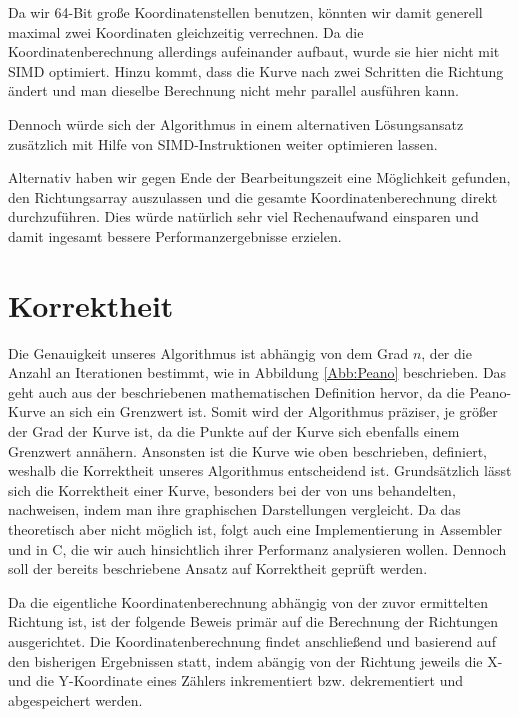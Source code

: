 \documentclass[course=asp]{aspdoc}
\begin{document}
Da wir 64-Bit gro\ss e Koordinatenstellen benutzen, k\"onnten wir damit generell maximal zwei Koordinaten gleichzeitig verrechnen. Da die Koordinatenberechnung allerdings aufeinander aufbaut, wurde sie hier nicht mit SIMD optimiert. Hinzu kommt, dass die Kurve nach zwei Schritten die Richtung \"andert und man dieselbe Berechnung nicht mehr parallel ausf\"uhren kann.

Dennoch w\"urde sich der Algorithmus in einem alternativen L\"osungsansatz zus\"atzlich mit Hilfe von SIMD-Instruktionen weiter optimieren lassen.  

Alternativ haben wir gegen Ende der Bearbeitungszeit eine M\"oglichkeit gefunden, den Richtungsarray auszulassen und die gesamte Koordinatenberechnung direkt durchzuf\"uhren. Dies w\"urde nat\"urlich sehr viel Rechenaufwand einsparen und damit ingesamt bessere Performanzergebnisse erzielen.

\section{Korrektheit} \label{Korrektheit} %

Die Genauigkeit unseres Algorithmus ist abh\"angig von dem Grad $n$, der die Anzahl an Iterationen bestimmt, wie in Abbildung \ref{Abb:Peano} beschrieben. Das geht auch aus der beschriebenen mathematischen Definition hervor, da die Peano-Kurve an sich ein Grenzwert ist. Somit wird der Algorithmus pr\"aziser, je gr\"o\ss er der Grad der Kurve ist, da die Punkte auf der Kurve sich ebenfalls einem Grenzwert ann\"ahern. Ansonsten ist die Kurve wie oben beschrieben, definiert, weshalb die Korrektheit unseres Algorithmus entscheidend ist.
Grunds\"atzlich l\"asst sich die Korrektheit einer Kurve, besonders bei der von uns behandelten, nachweisen, indem man ihre graphischen Darstellungen vergleicht. Da das theoretisch aber nicht m\"oglich ist, folgt auch eine Implementierung in Assembler und in C, die wir auch hinsichtlich ihrer Performanz analysieren wollen.
Dennoch soll der bereits beschriebene Ansatz auf Korrektheit gepr\"uft werden.


Da die eigentliche Koordinatenberechnung abh\"angig von der zuvor ermittelten Richtung ist, ist der folgende Beweis prim\"ar auf die Berechnung der Richtungen ausgerichtet.
Die Koordinatenberechnung findet anschlie\ss end und basierend auf den bisherigen Ergebnissen statt, indem ab\"angig von der Richtung jeweils die X- und die Y-Koordinate eines Z\"ahlers inkrementiert bzw. dekrementiert und abgespeichert werden.
\end{document}
